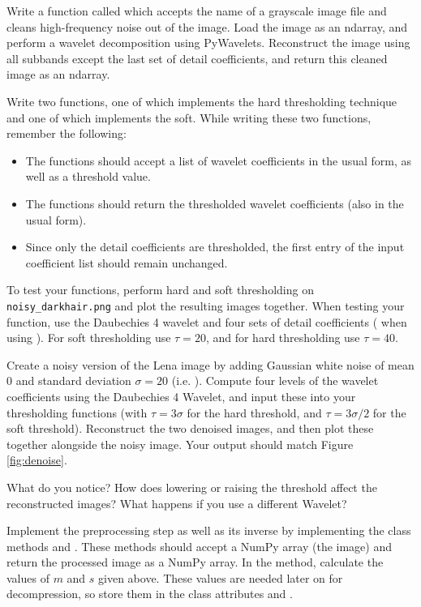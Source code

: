 Write a function called  which accepts the name of a grayscale image file and cleans high-frequency noise out of the image.
Load the image as an ndarray, and perform a wavelet decomposition using PyWavelets.
Reconstruct the image using all subbands except the last set of detail coefficients, and return this cleaned image as an ndarray.

Write two functions, one of which implements the hard thresholding technique and one of which implements the soft.
While writing these two functions, remember the following:
\begin{itemize}
\item The functions should accept a list of wavelet coefficients in the usual form, as well as a threshold value.
\item The functions should return the thresholded wavelet coefficients (also in the usual form).
\item Since only the detail coefficients are thresholded, the first entry of the input coefficient list should remain unchanged.
\end{itemize}
To test your functions, perform hard and soft thresholding on \texttt{noisy\_darkhair.png} and plot the resulting images together.
When testing your function, use the Daubechies 4 wavelet and four sets of detail coefficients ( when using ).
For soft thresholding use $\tau=20$, and for hard thresholding use $\tau=40$.

Create a noisy version of the Lena image by adding Gaussian
white noise of mean 0 and standard deviation $\sigma = 20$ (i.e. ).
Compute four levels of the wavelet coefficients using the Daubechies 4 Wavelet,
and input these into your
thresholding functions (with $\tau = 3\sigma$ for the hard threshold,
and $\tau = 3\sigma/2$ for the soft threshold). Reconstruct the
two denoised images, and then plot these together alongside the
noisy image. Your output should match Figure \ref{fig:denoise}.

What do you notice? How does lowering or raising the
threshold affect the reconstructed images? What happens if you use
a different Wavelet?

Implement the preprocessing step as well as its inverse by implementing the class methods  and .
These methods should accept a NumPy array (the image) and return the processed image as a NumPy array.
In the  method, calculate the values of $m$ and $s$ given above.
These values are needed later on for decompression, so store them in the class attributes  and .

